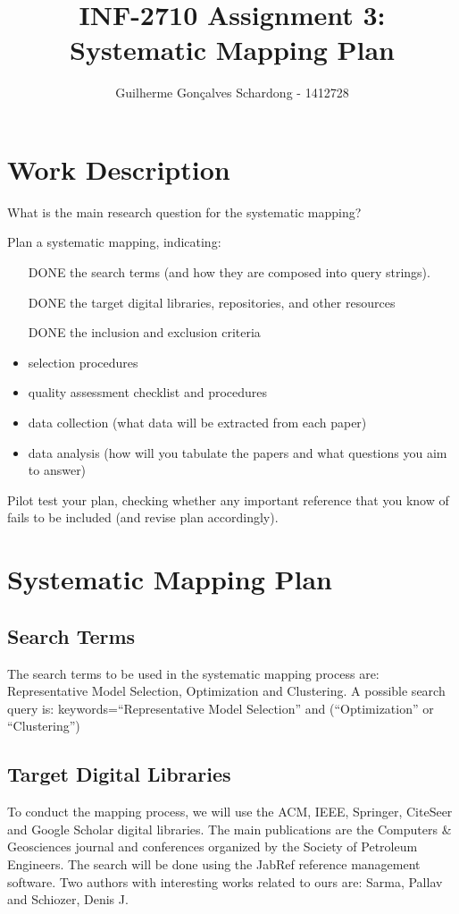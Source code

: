 \documentclass[]{article}
\title{INF-2710 Assignment 3: Systematic Mapping Plan}
\author{Guilherme Gon\c{c}alves Schardong - 1412728}
\begin{document}
\maketitle

\section{Work Description}
What is the main research question for the systematic mapping?

Plan a systematic mapping, indicating:
\begin{itemize}
\item [DONE] the search terms (and how they are composed into query strings).
\item [DONE] the target digital libraries, repositories, and other resources
\item [DONE] the inclusion and exclusion criteria
\item selection procedures
\item quality assessment checklist and procedures
\item data collection (what data will be extracted from each paper)
\item data analysis (how will you tabulate the papers and what questions you aim to answer)
\end{itemize}

Pilot test your plan, checking whether any important reference that you know of fails to be included (and revise plan accordingly).

\section{Systematic Mapping Plan}

\subsection{Search Terms}

The search terms to be used in the systematic mapping process are: Representative Model Selection, Optimization and Clustering.
A possible search query is: keywords=``Representative Model Selection'' and (``Optimization'' or ``Clustering'')

\subsection{Target Digital Libraries}

To conduct the mapping process, we will use the ACM, IEEE, Springer, CiteSeer and Google Scholar digital libraries. The main publications are the Computers \& Geosciences journal and conferences organized by the Society of Petroleum Engineers. The search will be done using the JabRef reference management software. Two authors with interesting works related to ours are: Sarma, Pallav and Schiozer, Denis J.
\end{document}
